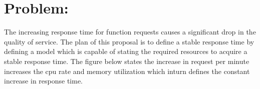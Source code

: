 

\section{Problem:}

The increasing response time for function requests causes a significant drop in the quality of service. 
The plan of this proposal is to define a stable response time by defining a model which is capable of stating the required resources to acquire a stable response time.
The figure below states the increase in request per minute increases the cpu rate and memory utilization which inturn defines the constant increase in response time.

